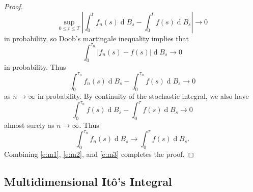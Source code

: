 \documentclass[11pt, a4paper]{memoir}
\theoremstyle{change}
\theoremstyle{plain}
\theoremstyle{nonumberplain}
\newtheorem{proof}{Proof}
\renewcommand{\d}[1]{\ensuremath{\operatorname{d}\!{#1}}}
\numberwithin{equation}{section}
\begin{document}
\begin{proof}
    \begin{equation*}
        \sup_{0\leq t\leq T}|\int_0^tf_n(s)\d{B_s}-\int_0^tf(s)\d{B_s}|\to 0
    \end{equation*}
    in probability, so Doob's martingale inequality implies that
    \begin{equation*}
        \int_0^{\tau_n}|f_n(s)-f(s)|\d{B_s}\to 0
    \end{equation*}
    in probability.
    Thus
    \begin{equation*}
        \int_0^{\tau_n}f_n(s)\d{B_s}-\int_0^{\tau_n}f(s)\d{B_s}\to 0
    \end{equation*}
    as $n\to\infty$ in probability.
    By continuity of the stochastic integral, we also have
    \begin{equation*}
        \int_0^{\tau_n}f(s)\d{B_s}-\int_0^\tau f(s)\d{B_s}\to 0
    \end{equation*}
    almost surely as $n\to\infty$.
    Thus
    \begin{equation}\label{e:m3}
        \int_0^{\tau_n}f_n(s)\d{B_s}\to\int_0^\tau f(s)\d{B_s}.
    \end{equation}
    Combining \cref{e:m1}, \cref{e:m2}, and \cref{e:m3} completes the proof.
\end{proof}
\subsection{Multidimensional Itô's Integral}
\end{document}
